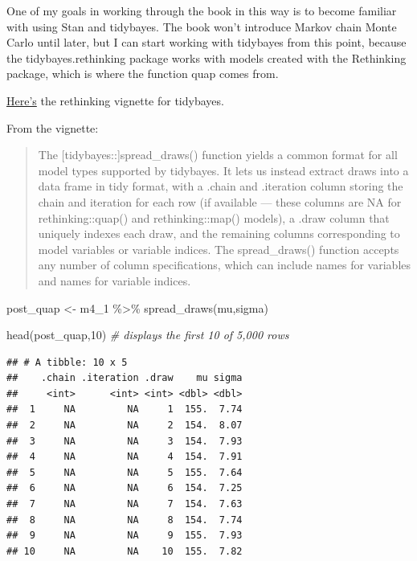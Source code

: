 \documentclass[
]{book}
\newenvironment{Shaded}{\begin{snugshade}}{\end{snugshade}}
\newcommand{\CommentTok}[1]{\textcolor[rgb]{0.56,0.35,0.01}{\textit{#1}}}
\newcommand{\DecValTok}[1]{\textcolor[rgb]{0.00,0.00,0.81}{#1}}
\newcommand{\FunctionTok}[1]{\textcolor[rgb]{0.00,0.00,0.00}{#1}}
\newcommand{\NormalTok}[1]{#1}
\newcommand{\OtherTok}[1]{\textcolor[rgb]{0.56,0.35,0.01}{#1}}
\newcommand{\SpecialCharTok}[1]{\textcolor[rgb]{0.00,0.00,0.00}{#1}}
\begin{document}
One of my goals in working through the book in this way is to become familiar with using Stan and tidybayes. The book won't introduce Markov chain Monte Carlo until later, but I can start working with tidybayes from this point, because the tidybayes.rethinking package works with models created with the Rethinking package, which is where the function quap comes from.

\href{https://mjskay.github.io/tidybayes.rethinking/articles/tidy-rethinking.html}{Here's} the rethinking vignette for tidybayes.

From the vignette:

\begin{quote}
The {[}tidybayes::{]}spread\_draws() function yields a common format for all model types supported by tidybayes. It lets us instead extract draws into a data frame in tidy format, with a .chain and .iteration column storing the chain and iteration for each row (if available --- these columns are NA for rethinking::quap() and rethinking::map() models), a .draw column that uniquely indexes each draw, and the remaining columns corresponding to model variables or variable indices. The spread\_draws() function accepts any number of column specifications, which can include names for variables and names for variable indices.
\end{quote}

\begin{Shaded}
\begin{Highlighting}[]
\NormalTok{post\_quap }\OtherTok{\textless{}{-}}\NormalTok{ m4\_1 }\SpecialCharTok{\%\textgreater{}\%}
  \FunctionTok{spread\_draws}\NormalTok{(mu,sigma)}

\FunctionTok{head}\NormalTok{(post\_quap,}\DecValTok{10}\NormalTok{) }\CommentTok{\# displays the first 10 of 5,000 rows}
\end{Highlighting}
\end{Shaded}

\begin{verbatim}
## # A tibble: 10 x 5
##    .chain .iteration .draw    mu sigma
##     <int>      <int> <int> <dbl> <dbl>
##  1     NA         NA     1  155.  7.74
##  2     NA         NA     2  154.  8.07
##  3     NA         NA     3  154.  7.93
##  4     NA         NA     4  154.  7.91
##  5     NA         NA     5  155.  7.64
##  6     NA         NA     6  154.  7.25
##  7     NA         NA     7  154.  7.63
##  8     NA         NA     8  154.  7.74
##  9     NA         NA     9  155.  7.93
## 10     NA         NA    10  155.  7.82
\end{verbatim}
\end{document}
